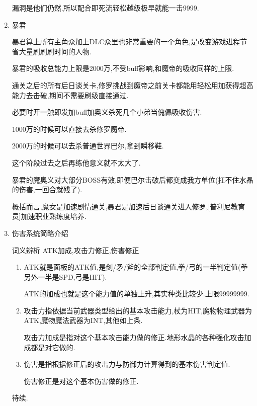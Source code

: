 \begin{enumerate}
	漏洞是他们仍然{\color{red}{吃即死}}.所以配合即死流轻松越级极早就能一击9999.

	\item{暴君}

	暴君算上所有主角众加上DLC众里也非常重要的一个角色,是改变游戏进程节省大量刷刷刷时间的人物.

	暴君的吸收总能力上限是2000万,不受buff影响,和魔帝的吸收同样的上限.

	通关之后的所有后日谈关卡,修罗挑战到魔帝之前关卡都能用轻松用{\color{red}{即死流}}加{\color{red}{暴君吸收}}获得超高能力去击破,期间不需要刷级直接通过.

	必要时开一触即发加buff加奥义杀死几个小弟当傀儡吸收伤害.

	1000万的时候可以直接去杀修罗魔帝.

	2000万的时候可以去杀普通世界巴尔,拿到瞬移鞋.

	这个阶段过去之后再练他意义就不太大了.

	暴君的魔奥义对大部分BOSS有效,即便巴尔击破后都变成我方单位(扛不住水晶的伤害,一回合就残了).

	概括而言,魔女是加速剧情通关,暴君是加速后日谈通关进入修罗,[普利尼教育员]加速职业熟练度培养.


	\item{伤害系统简略介绍}

	词义辨析 ATK加成,攻击力修正,伤害修正
	
	\begin{enumerate}
		\item  
		ATK就是面板的ATK值,是剑/矛/斧的全部判定值,拳/弓的一半判定值(拳另外一半是SPD,弓是HIT).

		ATK的加成也就是这个能力值的单独上升,其实种类比较少.上限99999999.

		\item
		攻击力指依据当前武器类型给出的基本攻击能力,杖为HIT,魔物物理武器为ATK,魔物魔法武器为INT,其他如上条.

		攻击力加成是指对这个基本攻击能力做的修正.地形水晶的各种强化攻击加成都是对它做的.

		\item
		伤害是指根据修正后的攻击力与防御力计算得到的基本伤害判定值.

		伤害修正是对这个基本伤害做的修正.

	\end{enumerate}

	待续.


\end{enumerate}

\newpage

